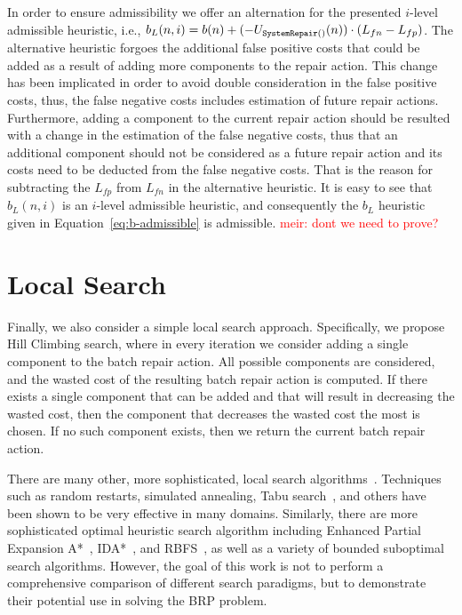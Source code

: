 \documentclass[a4paper,11pt]{report}
\newcommand\meir[1]{\textcolor{red}{meir: #1}}
\newcommand\sysrep[1]{{\tt SystemRepair(#1)}}
\begin{document}
In order to ensure admissibility we offer an alternation for the presented $i$-level admissible heuristic,
i.e., $b_L(n,i)=b(n)+(-U_{\sysrep{}}(n))\cdot(L_{fn}-L_{fp})$. 
The alternative heuristic forgoes the additional false positive costs that could be added as a result of adding more components to the repair action. This change has been implicated in order to avoid double consideration in the false positive costs, thus, the false negative costs includes estimation of future repair actions. Furthermore, adding a component to the current repair action should be resulted with a change in the estimation of the false negative costs, thus that an additional component should not be considered as a future repair action and its costs need to be deducted from the false negative costs. That is the reason for subtracting the $L_{fp}$ from $L_{fn}$ in the alternative heuristic. 
It is easy to see that $b_L(n,i)$ is an $i$-level admissible heuristic, and consequently 
the $b_L$ heuristic given in Equation~\ref{eq:b-admissible} is admissible. \meir{dont we need to prove?}


\section{Local Search}
Finally, we also consider a simple local search approach. 
Specifically, we propose Hill Climbing search, where in every iteration we consider adding a single component to the batch repair action. All possible components are considered, and the wasted cost of the resulting 
batch repair action is computed. If there exists a single component that can be added and that will result in decreasing the wasted cost, then the component that decreases the wasted cost the most is chosen. 
If no such component exists, then we return the current batch repair action. 


There are many other, more sophisticated, local search algorithms~\cite{lourencco2003iterated}. Techniques such as random restarts, simulated annealing, Tabu search~\cite{glover2013tabu}, and others have been shown to be very effective in many domains. Similarly, there are more sophisticated optimal heuristic search algorithm including Enhanced Partial Expansion A*~\cite{goldenberg2014enanced}, IDA*~\cite{korf1985depth}, and RBFS~\cite{korf1993linear}, as well as a variety of bounded suboptimal search algorithms. However, the goal of this work is not to perform a comprehensive comparison of different search paradigms, but to demonstrate their potential use in solving the BRP problem. 
\end{document}
